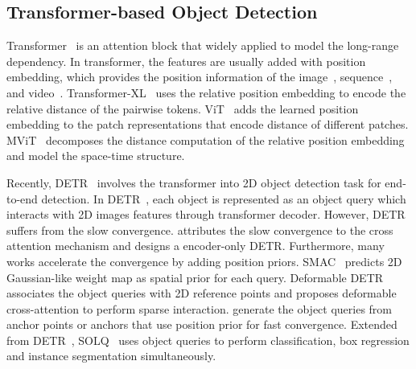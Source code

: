 \documentclass[runningheads]{llncs}
\begin{document}
\subsection{Transformer-based Object Detection}
Transformer~\cite{vaswani2017attention} is an attention block that widely applied to model the long-range dependency. In transformer, the features are usually added with position embedding, which provides the position information of the image~\cite{dosovitskiy2020image,wu2021rethinking,liu2021swin}, sequence~\cite{gehring2017convolutional,vaswani2017attention,devlin2018bert,dai2019transformer,yang2019xlnet}, and video~\cite{bertasius2021space,li2021improved,wu2022memvit}. Transformer-XL~\cite{dai2019transformer} uses the relative position embedding to encode the relative distance of the pairwise tokens. ViT~\cite{dosovitskiy2020image} adds the learned position embedding to the patch representations that encode distance of different patches. MViT~\cite{li2021improved} decomposes the distance computation of the relative position embedding and model the space-time structure.

Recently, DETR~\cite{carion2020detr} involves the transformer into 2D object detection task for end-to-end detection.
In DETR~\cite{carion2020detr}, each object is represented as an object query which interacts with 2D images features through transformer decoder. However, DETR~\cite{carion2020detr} suffers from the slow convergence. \cite{sun2021rethinking} attributes the slow convergence to the cross attention mechanism and designs a encoder-only DETR. Furthermore, many works accelerate the convergence by adding position priors. SMAC~\cite{gao2021fast} predicts 2D Gaussian-like weight map as spatial prior for each query.
Deformable DETR~\cite{zhu2020deformable} associates the object queries with 2D reference points and proposes deformable cross-attention to perform sparse interaction. \cite{wang2021anchor,meng2021conditional,liu2022dab} generate the object queries from anchor points or anchors that use position prior for fast convergence. Extended from DETR~\cite{zhu2020deformable}, SOLQ~\cite{dong2021solq} uses object queries to perform classification, box regression and instance segmentation simultaneously. 
\end{document}

